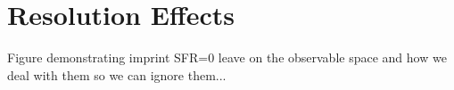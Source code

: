 \section{Resolution Effects} \label{sec:res}

Figure demonstrating imprint SFR=0 leave on the observable space and 
how we deal with them so we can ignore them...
